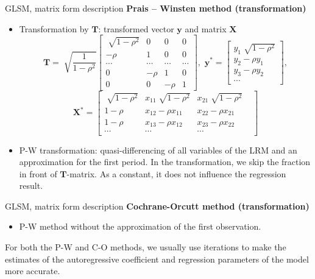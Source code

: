 \documentclass{beamer}
\begin{document}
\begin{frame}{GLSM, matrix form description}
\textbf{Prais -- Winsten method (transformation)}
\begin{itemize}
\item Transformation by $\boldsymbol{T}$: transformed vector $\boldsymbol{y}$ and matrix $\boldsymbol{X}$
$$\boldsymbol{T}=\sqrt[]{\frac{1}{1-\rho^2}}
\begin{bmatrix}
 \sqrt[]{1-\rho^2}&  0 & 0 & 0\\
 - \rho &  1&  0 & 0\\ 
 \cdots & \cdots & \cdots & \cdots \\
0 &  -\rho &  1& 0\\ 
0 & 0 & -\rho &1 
\end{bmatrix}, \,\,
\boldsymbol{y^\ast}=
\begin{bmatrix}
y_1\sqrt[]{1-\rho^2}\\
y_2-\rho y_1\\
y_3-\rho y_2 \\
\cdots
\end{bmatrix},
$$ $$
\boldsymbol{X^\ast}=\begin{bmatrix}
\sqrt[]{1-\rho^2} & x_{11}\sqrt[]{1-\rho^2} & x_{21}\sqrt[]{1-\rho^2}\\
1-\rho & x_{12}-\rho x_{11} & x_{22}-\rho x_{21} \\
1-\rho & x_{13}-\rho x_{12} & x_{23}-\rho x_{22} \\
\cdots & \cdots & \cdots &
\end{bmatrix}
$$
\item P-W  transformation: quasi-differencing of all variables of the LRM and an approximation for the first period. In the transformation, we skip the fraction in front of $\boldsymbol{T}$-matrix. As a constant, it does not influence the regression result.
\end{itemize}
\end{frame}
\begin{frame}{GLSM, matrix form description}
\textbf{Cochrane-Orcutt method (transformation)}
\begin{itemize}
\item P-W method without the approximation of the first observation.
\end{itemize}
\vspace{1cm}
For both the P-W and C-O methods, we usually use iterations to make the estimates of the autoregressive coefficient and regression parameters of the model more accurate.
\end{frame}
\end{document}
